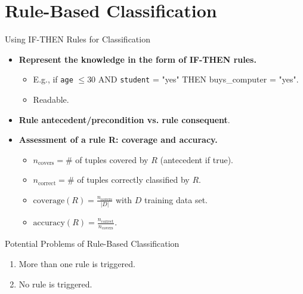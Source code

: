 \section{Rule-Based Classification}

\begin{frame}{Using \uppercase{if-then} Rules for Classification}
	\begin{itemize}
		\item \textbf{Represent the knowledge in the form of {\color{airforceblue}IF-THEN rules}.}
		      \begin{itemize}
			      \item E.g., if \texttt{age} $\leq 30$ AND \texttt{student} = "yes" THEN buys\_computer = "yes".
			      \item Readable.
		      \end{itemize}
		\item \textbf{Rule {\color{airforceblue}antecedent/precondition} vs. rule {\color{airforceblue}consequent}}.
		\item \textbf{Assessment of a rule R: coverage and accuracy.}
		      \begin{itemize}
			      \item $n_{\text{covers}} = \#$ of tuples covered by $R$ (antecedent if true).
			      \item $n_{\text{correct}} = \#$ of tuples correctly classified by $R$.
			      \item $\text{coverage}(R) = \frac{n_{\text{covers}}}{|D|}$ with $D$ training data set.
			      \item $\text{accuracy}(R) = \frac{n_{\text{correct}}}{n_{\text{covers}}}$.
		      \end{itemize}
	\end{itemize}
\end{frame}

\begin{frame}[c]{Potential Problems of Rule-Based Classification}
	\centering
	\huge
	\begin{enumerate}
		\item More than one rule is triggered.
		\item No rule is triggered.
	\end{enumerate}
\end{frame}

